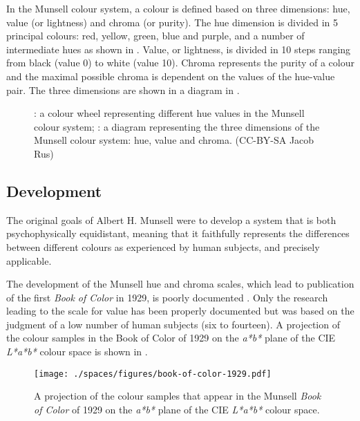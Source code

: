 In the Munsell colour system, a colour is defined based on three
dimensions: hue, value (or lightness) and chroma (or purity). The hue
dimension is divided in 5 principal colours: red, yellow, green, blue
and purple, and a number of intermediate hues as shown in . Value, or lightness, is divided in 10
steps ranging from black (value 0) to white (value 10). Chroma
represents the purity of a colour and the maximal possible chroma is
dependent on the values of the hue-value pair. The three dimensions
are shown in a diagram in .

\begin{figure}[htbp]
\centering
{}
\caption[The Munsell colour system]{: a colour wheel representing different hue values in the Munsell colour system; : a diagram representing the three dimensions of the Munsell colour system: hue, value and chroma. (CC-BY-SA Jacob Rus)}
\end{figure}

\subsection{Development}

The original goals of Albert H. Munsell were to develop a system that
is both psychophysically equidistant, meaning that it faithfully
represents the differences between different colours as experienced by
human subjects, and precisely applicable.

The development of the Munsell hue and chroma scales, which lead to
publication of the first \textit{Book of Color} in 1929, is poorly documented
\citep{berns82development}. Only the research leading to the scale for
value has been properly documented but was based on the judgment of a
low number of human subjects (six to fourteen). A projection of the
colour samples in the Book of Color of 1929 on the \emph{a*b*} plane
of the CIE \emph{L*a*b*} colour space is shown in .

\begin{figure}[htbp]
\begin{center}
\texttt{[image: ./spaces/figures/book-of-color-1929.pdf]}
\caption[Colour samples of The Munsell Book of Color of 1929]{A projection of the colour samples that appear in the Munsell \textit{Book of Color} of 1929 on the \emph{a*b*} plane of the CIE \emph{L*a*b*} colour space.}
\label{f:book-of-color-1929}
\end{center}
\end{figure}

